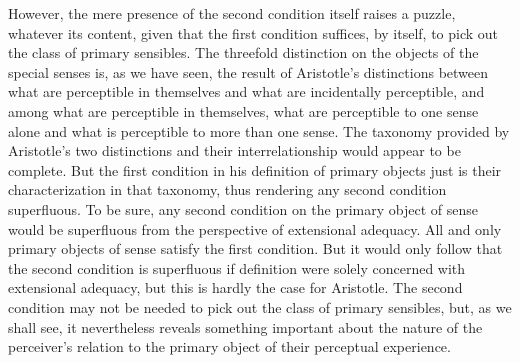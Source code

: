 However, the mere presence of the second condition itself raises a puzzle, whatever its content, given that the first condition suffices, by itself, to pick out the class of primary sensibles. The threefold distinction on the objects of the special senses is, as we have seen, the result of Aristotle's distinctions between what are perceptible in themselves and what are incidentally perceptible, and among what are perceptible in themselves, what are perceptible to one sense alone and what is perceptible to more than one sense. The taxonomy provided by Aristotle's two distinctions and their interrelationship would appear to be complete. But the first condition in his definition of primary objects just is their characterization in that taxonomy, thus rendering any second condition superfluous. To be sure, any second condition on the primary object of sense would be superfluous from the perspective of extensional adequacy. All and only primary objects of sense satisfy the first condition. But it would only follow that the second condition is superfluous if definition were solely concerned with extensional adequacy, but this is hardly the case for Aristotle. The second condition may not be needed to pick out the class of primary sensibles, but, as we shall see, it nevertheless reveals something important about the nature of the perceiver's relation to the primary object of their perceptual experience.

